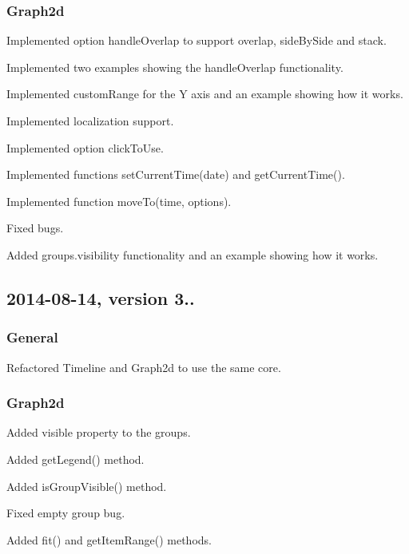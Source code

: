 \subsubsection*{Graph2d}


\begin{DoxyItemize}
\item Implemented option {\ttfamily handle\+Overlap} to support overlap, side\+By\+Side and stack.
\item Implemented two examples showing the {\ttfamily handle\+Overlap} functionality.
\item Implemented {\ttfamily custom\+Range} for the Y axis and an example showing how it works.
\item Implemented localization support.
\item Implemented option {\ttfamily click\+To\+Use}.
\item Implemented functions {\ttfamily set\+Current\+Time(date)} and {\ttfamily get\+Current\+Time()}.
\item Implemented function {\ttfamily move\+To(time, options)}.
\item Fixed bugs.
\item Added groups.\+visibility functionality and an example showing how it works.
\end{DoxyItemize}

\subsection*{2014-\/08-\/14, version 3..}

\subsubsection*{General}


\begin{DoxyItemize}
\item Refactored Timeline and Graph2d to use the same core.
\end{DoxyItemize}

\subsubsection*{Graph2d}


\begin{DoxyItemize}
\item Added {\ttfamily visible} property to the groups.
\item Added {\ttfamily get\+Legend()} method.
\item Added {\ttfamily is\+Group\+Visible()} method.
\item Fixed empty group bug.
\item Added {\ttfamily fit()} and {\ttfamily get\+Item\+Range()} methods.
\end{DoxyItemize}

